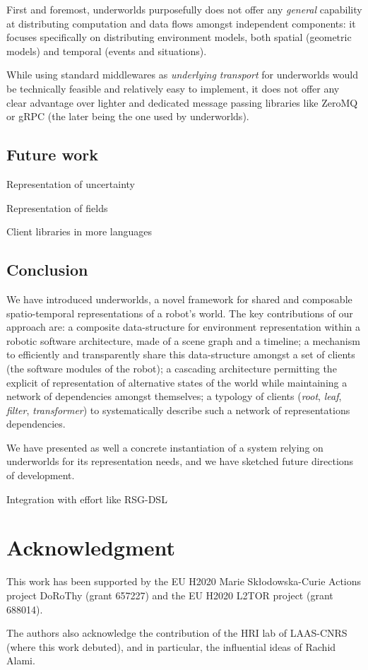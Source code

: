 \documentclass[letterpaper, 10 pt, conference]{ieeeconf}  %
\newcommand{\uwds}{{\sc underworlds}\xspace}
\begin{document}
First and foremost, \uwds purposefully does not offer any \emph{general}
capability at distributing computation and data flows amongst independent
components: it focuses specifically on distributing environment models, both
spatial (geometric models) and temporal (events and situations).

While using standard middlewares as \emph{underlying transport} for \uwds would be
technically feasible and relatively easy to implement, it does not offer any
clear advantage over lighter and dedicated message passing libraries like ZeroMQ
or gRPC (the later being the one used by \uwds).

\subsection{Future work}
\label{futurework}

Representation of uncertainty

Representation of fields

Client libraries in more languages


\subsection{Conclusion}

We have introduced \uwds, a novel framework for shared and composable
spatio-temporal representations of a robot's world. The key contributions of our
approach are: a composite data-structure for environment representation within a
robotic software architecture, made of a scene graph and a timeline; a mechanism
to efficiently and transparently share this data-structure amongst a set of
clients (the software modules of the robot); a cascading architecture permitting
the explicit of representation of alternative states of the world while
maintaining a network of dependencies amongst themselves; a typology of clients
(\emph{root}, \emph{leaf}, \emph{filter}, \emph{transformer}) to systematically
describe such a network of representations dependencies.

We have presented as well a concrete instantiation of a system relying on \uwds
for its representation needs, and we have sketched future directions of
development.

Integration with effort like RSG-DSL~\cite{blumenthal2014towards}

\section*{Acknowledgment}

This work has been supported by the EU H2020 Marie Sk\l odowska-Curie Actions
project DoRoThy (grant 657227) and the EU H2020 L2TOR project (grant 688014).

The authors also acknowledge the contribution of the HRI lab of LAAS-CNRS (where this
work debuted), and in particular, the influential ideas of Rachid Alami.



\end{document}
